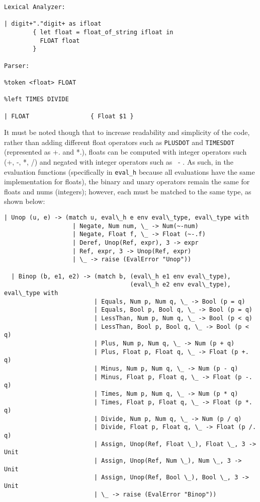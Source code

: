 \documentclass{article}
\def\code#1{\texttt{#1}}
\begin{document}
\begin{verbatim}
Lexical Analyzer: 

| digit+"."digit+ as ifloat
        { let float = float_of_string ifloat in
          FLOAT float
        }

Parser:

%token <float> FLOAT

%left TIMES DIVIDE

| FLOAT                 { Float $1 }
\end{verbatim}

It must be noted though that to increase readability and simplicity of the code, rather than adding different float operators such as \code{PLUSDOT} and \code{TIMESDOT} (represented as +. and *.), floats can be computed with integer operators such (+, -, *, /) and negated with integer operators such as ~- . As such, in the evaluation functions (specifically in \code{eval\_h} because all evaluations have the same implementation for floats), the binary and unary operators remain the same for floats and nums (integers); however, each must be matched to the same type, as shown below: 


\begin{verbatim}
| Unop (u, e) -> (match u, eval\_h e env eval\_type, eval\_type with 
                   | Negate, Num num, \_ -> Num(~-num)
                   | Negate, Float f, \_ -> Float (~-.f)
                   | Deref, Unop(Ref, expr), 3 -> expr
                   | Ref, expr, 3 -> Unop(Ref, expr) 
                   | \_ -> raise (EvalError "Unop"))

  | Binop (b, e1, e2) -> (match b, (eval\_h e1 env eval\_type), 
                                   (eval\_h e2 env eval\_type), eval\_type with  
                         | Equals, Num p, Num q, \_ -> Bool (p = q)
                         | Equals, Bool p, Bool q, \_ -> Bool (p = q)
                         | LessThan, Num p, Num q, \_ -> Bool (p < q)
                         | LessThan, Bool p, Bool q, \_ -> Bool (p < q)
                         | Plus, Num p, Num q, \_ -> Num (p + q)
                         | Plus, Float p, Float q, \_ -> Float (p +. q)
                         | Minus, Num p, Num q, \_ -> Num (p - q)
                         | Minus, Float p, Float q, \_ -> Float (p -. q)
                         | Times, Num p, Num q, \_ -> Num (p * q) 
                         | Times, Float p, Float q, \_ -> Float (p *. q)
                         | Divide, Num p, Num q, \_ -> Num (p / q)
                         | Divide, Float p, Float q, \_ -> Float (p /. q)
                         | Assign, Unop(Ref, Float \_), Float \_, 3 -> Unit
                         | Assign, Unop(Ref, Num \_), Num \_, 3 -> Unit
                         | Assign, Unop(Ref, Bool \_), Bool \_, 3 -> Unit
                         | \_ -> raise (EvalError "Binop"))   
\end{verbatim}
\end{document}
